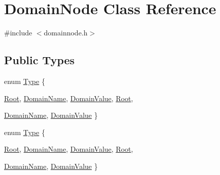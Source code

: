 \hypertarget{class_domain_node}{
\section{DomainNode Class Reference}
\label{class_domain_node}
}


{\ttfamily \#include $<$domainnode.h$>$}

\subsection*{Public Types}
\begin{DoxyCompactItemize}
\item 
enum \hyperlink{class_domain_node_a0fb690a57557ab235757fd123557fb4f}{Type} \{ \par
\hyperlink{class_domain_node_a0fb690a57557ab235757fd123557fb4fa781330f4e00a1b03c74f7d0834c8b574}{Root}, 
\hyperlink{class_domain_node_a0fb690a57557ab235757fd123557fb4fac18dd47df3fbc8f3541e995ef2d6bdb3}{DomainName}, 
\hyperlink{class_domain_node_a0fb690a57557ab235757fd123557fb4fa24fdfc42a406f3b8e5b3a44c328e4ab3}{DomainValue}, 
\hyperlink{class_domain_node_a0fb690a57557ab235757fd123557fb4fa781330f4e00a1b03c74f7d0834c8b574}{Root}, 
\par
\hyperlink{class_domain_node_a0fb690a57557ab235757fd123557fb4fac18dd47df3fbc8f3541e995ef2d6bdb3}{DomainName}, 
\hyperlink{class_domain_node_a0fb690a57557ab235757fd123557fb4fa24fdfc42a406f3b8e5b3a44c328e4ab3}{DomainValue}
 \}
\item 
enum \hyperlink{class_domain_node_a0fb690a57557ab235757fd123557fb4f}{Type} \{ \par
\hyperlink{class_domain_node_a0fb690a57557ab235757fd123557fb4fa781330f4e00a1b03c74f7d0834c8b574}{Root}, 
\hyperlink{class_domain_node_a0fb690a57557ab235757fd123557fb4fac18dd47df3fbc8f3541e995ef2d6bdb3}{DomainName}, 
\hyperlink{class_domain_node_a0fb690a57557ab235757fd123557fb4fa24fdfc42a406f3b8e5b3a44c328e4ab3}{DomainValue}, 
\hyperlink{class_domain_node_a0fb690a57557ab235757fd123557fb4fa781330f4e00a1b03c74f7d0834c8b574}{Root}, 
\par
\hyperlink{class_domain_node_a0fb690a57557ab235757fd123557fb4fac18dd47df3fbc8f3541e995ef2d6bdb3}{DomainName}, 
\hyperlink{class_domain_node_a0fb690a57557ab235757fd123557fb4fa24fdfc42a406f3b8e5b3a44c328e4ab3}{DomainValue}
 \}
\end{DoxyCompactItemize}
